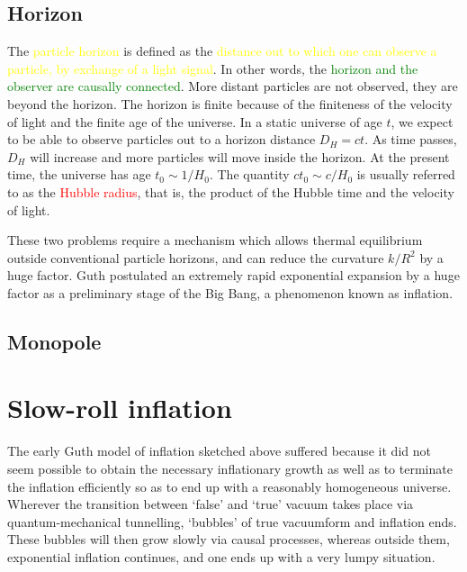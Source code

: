 \documentclass[12pt,a4paper]{article}
\begin{document}
\subsection{Horizon}
\cite{2008cosm.book.....W}

\cite{perkins2008particle} The \textcolor{yellow}{particle horizon} is defined as the \textcolor{yellow}{distance out to which one can observe a particle, by exchange of a light signal}. In other words, the \textcolor{green}{horizon and the observer are causally connected}. More distant particles are not observed, they are beyond the horizon. The horizon is finite because of the finiteness of the velocity of light and the finite age of the universe. In a static universe of age $t$, we expect to be able to observe particles out to a horizon distance $D_H = ct$. As time passes, $D_H$ will increase and more particles will move inside the horizon. At the present time, the universe has age $t_0 \sim 1/H_0$. The quantity $ct_0 \sim c/H_0$ is usually referred to as the \textcolor{red}{Hubble radius}, that is, the product of the Hubble time and the velocity of light.

These two problems require a mechanism which allows thermal equilibrium outside conventional particle horizons, and can reduce the curvature $k/R^2$ by a huge factor. Guth postulated an extremely rapid exponential expansion by a huge factor as a preliminary stage of the Big Bang, a phenomenon known as inflation. 

\cite{ryden2016introduction}



\subsection{Monopole}
\cite{2008cosm.book.....W}

\cite{perkins2008particle} 

\cite{ryden2016introduction}




\section{Slow-roll inflation}

\cite{2008cosm.book.....W}



\cite{perkins2008particle} The early Guth model of inflation sketched above suffered because it did not seem possible to obtain the necessary inflationary growth as well as to terminate the inflation efficiently so as to end up with a reasonably homogeneous
universe. Wherever the transition between `false' and `true' vacuum takes place via quantum-mechanical tunnelling, `bubbles' of true vacuumform and inflation ends. These bubbles will then grow slowly via causal processes, whereas outside them, exponential inflation continues, and one ends up with a very lumpy situation.
\end{document}
